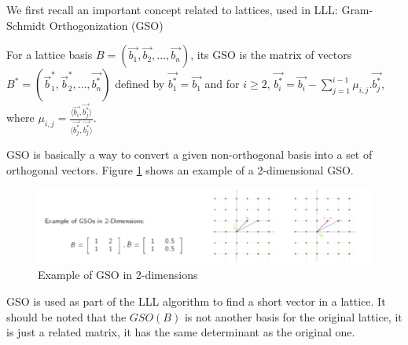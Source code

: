 We first recall an important concept related to lattices, used in LLL:
Gram-Schmidt Orthogonization (GSO)
\begin{definition}
  [GSO] For a lattice basis
  $B = \left( \vec{b_1}, \vec{b_2}, \dots, \vec{b_n} \right)$, its GSO is the
  matrix of vectors
  $B^* = \left( \vec{b}_1^*, \vec{b}_2^*, \dots, \vec{b_n^*} \right)$ defined by
  $\vec{b_1^*} = \vec{b_1}$ and for $i \geq 2$,
  $\vec{b_i^*} = \vec{b_i} - \sum_{j=1}^{i-1}{\mu_{i,j}.\vec{b_j^*}}$, where
  $\mu_{i,j} = \frac{\langle \vec{b_i}, \vec{b_j^*} \rangle}{\langle
    \vec{b_j^*},\vec{b_j^*} \rangle}$.
  \label{def:GSO}
\end{definition}
GSO is basically a way to convert a given non-orthogonal basis into a set of orthogonal vectors. Figure \ref{fig:gso} shows an
example of a 2-dimensional GSO. 
\begin{figure}[h]
  \centering \includegraphics[scale=0.3]{gso}
  \caption{Example of GSO in 2-dimensions}
  \label{fig:gso}
\end{figure}
GSO is used as part of the LLL algorithm to find a short vector in a lattice.
It should be noted that the $GSO(B)$ is not another basis for the original lattice, it is just
a related matrix, it has the same determinant as the original one.



